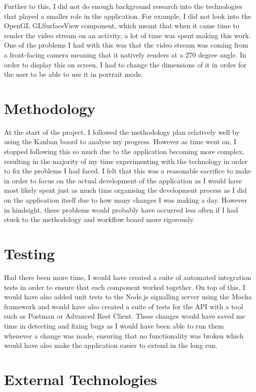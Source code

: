 \documentclass[]{report}
\begin{document}
		Further to this, I did not do enough background research into the technologies that played a smaller role in the application. For example, I did not look into the OpenGL GLSurfaceView component, which meant that when it came time to render the video stream on an activity, a lot of time was spent making this work. One of the problems I had with this was that the video stream was coming from a front-facing camera meaning that it natively renders at a 270 degree angle. In order to display this on screen, I had to change the dimensions of it in order for the user to be able to use it in portrait mode.
		
		\section{Methodology}
		At the start of the project, I followed the methodology plan relatively well by using the Kanban board to analyse my progress. However as time went on, I stopped following this so much due to the application becoming more complex, resulting in the majority of my time experimenting with the technology in order to fix the problems I had faced. I felt that this was a reasonable sacrifice to make in order to focus on the actual development of the application as I would have most likely spent just as much time organising the development process as I did on the application itself due to how many changes I was making a day. However in hindsight, these problems would probably have occurred less often if I had stuck to the methodology and workflow board more rigorously.
		
		\section{Testing}
		Had there been more time, I would have created a suite of automated integration tests in order to ensure that each component worked together. On top of this, I would have also added unit tests to the Node.js signalling server using the Mocha framework and would have also created a suite of tests for the API with a tool such as Postman or Advanced Rest Client. These changes would have saved me time in detecting and fixing bugs as I would have been able to run them whenever a change was made, ensuring that no functionality was broken which would have also make the application easier to extend in the long run.
				
		\section{External Technologies}
\end{document}
